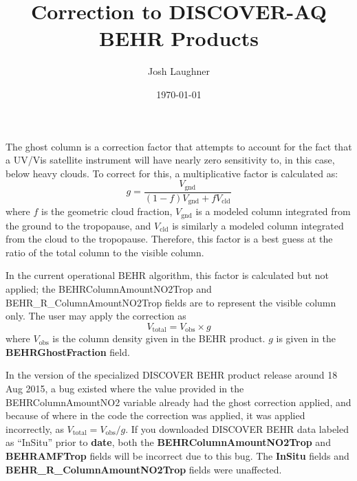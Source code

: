 \documentclass[12pt]{article}
\title{Correction to DISCOVER-AQ BEHR Products}
\author{Josh Laughner}
\date{\today}
\begin{document}
\maketitle

	The ghost column is a correction factor that attempts to account for the fact that a UV/Vis satellite instrument will have nearly zero sensitivity to, in this case,  below heavy clouds.  To correct for this, a multiplicative factor is calculated as:
	\begin{equation}
		g = \frac{V_{\mathrm{gnd}}}{(1-f)V_{\mathrm{gnd}} + f V_{\mathrm{cld}}}
	\end{equation}
where $f$ is the geometric cloud fraction, $V_{\mathrm{gnd}}$ is a modeled  column integrated from the ground to the tropopause, and $V_{\mathrm{cld}}$ is similarly a modeled  column integrated from the cloud to the tropopause.  Therefore, this factor is a best guess at the ratio of the total column to the visible column.

	In the current operational BEHR algorithm, this factor is calculated but not applied; the BEHRColumnAmountNO2Trop and BEHR\_R\_ColumnAmountNO2Trop fields are to represent the visible column only.  The user may apply the correction as
	\begin{equation}
		V_{\mathrm{total}} = V_{\mathrm{obs}} \times g
	\end{equation}
	where $V_{\mathrm{obs}}$ is the column density given in the BEHR product. $g$ is given in the \textbf{BEHRGhostFraction} field.
	
	In the version of the specialized DISCOVER BEHR product release around 18 Aug 2015, a bug existed where the value provided in the BEHRColumnAmountNO2 variable already had the ghost correction applied, and because of where in the code the correction was applied, it was applied incorrectly, as $V_{\mathrm{total}} = V_{\mathrm{obs}} / g$. If you downloaded DISCOVER BEHR data labeled as ``InSitu'' prior to \textbf{date}, both the \textbf{BEHRColumnAmountNO2Trop} and \textbf{BEHRAMFTrop} fields will be incorrect due to this bug.  The \textbf{InSitu} fields and \textbf{BEHR\_R\_ColumnAmountNO2Trop} fields were unaffected.
\end{document}
